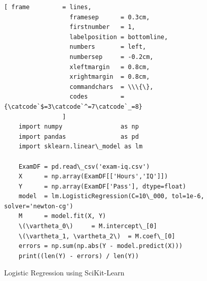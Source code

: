 \begin{figure}[!ht]
\centering
\begin{Verbatim}[ frame         = lines, 
                  framesep      = 0.3cm, 
                  firstnumber   = 1,
                  labelposition = bottomline,
                  numbers       = left,
                  numbersep     = -0.2cm,
                  xleftmargin   = 0.8cm,
                  xrightmargin  = 0.8cm,
                  commandchars  = \\\{\},
                  codes         = {\catcode`$=3\catcode`^=7\catcode`_=8}
                ]
    import numpy                as np
    import pandas               as pd
    import sklearn.linear\_model as lm
  
    ExamDF = pd.read\_csv('exam-iq.csv')
    X      = np.array(ExamDF[['Hours','IQ']])
    Y      = np.array(ExamDF['Pass'], dtype=float)
    model  = lm.LogisticRegression(C=10\_000, tol=1e-6, solver='newton-cg')
    M      = model.fit(X, Y)
    \(\vartheta_0\)     = M.intercept\_[0]
    \(\vartheta_1, \vartheta_2\)  = M.coef\_[0]
    errors = np.sum(np.abs(Y - model.predict(X)))
    print((len(Y) - errors) / len(Y))
\end{Verbatim}
\vspace*{-0.3cm}
\caption{Logistic Regression using SciKit-Learn}
\label{fig:Logistic-Regression-with-SciKit-Learn.ipynb}
\end{figure}
\FloatBarrier

